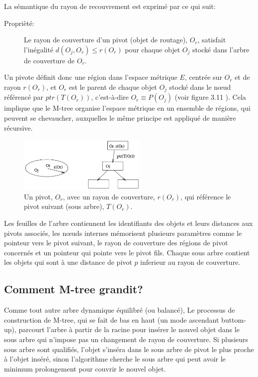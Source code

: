 La sémantique du rayon de recouvrement est exprimé par ce qui suit:
\begin{description}
	\item[Proprièté:] Le rayon de couverture d'un pivot (objet de routage), $ O_r $, satisfait l'inégalité $ d(O_j, O_r) \le r(O_r) $ pour chaque objet $ O_j $ stocké dans l'arbre de couverture de $ O_r $.
\end{description}

Un pivote définit donc une région dans l'espace métrique $ E $, centrée sur $ O_r $ et de rayon $ r(O_r) $, et $ O_r $ est le parent de chaque objet $ O_j $ stocké dans le nœud référencé par $ ptr(T(O_r)) $, c'est-à-dire $ O_r \equiv P(O_j)$ (voir figure 3.11 ).  Cela implique que le M-tree organise l'espace métrique en un ensemble de régions, qui peuvent se chevaucher, auxquelles le même principe est appliqué de manière récursive.

\begin{figure}[H]
	\centering
	\includegraphics[width=0.55\textwidth]{Figures/mtree.png} %
	\caption{ Un pivot, $ O_r $, avec un rayon de couverture, $  r(O_r) $, qui référence le pivot suivant (sous arbre), $ T(O_r) $.}
\end{figure}

Les feuilles de l’arbre contiennent les identifiants des objets et leurs distances aux pivots associés, les nœuds internes mémorisent plusieurs paramètres comme le pointeur vers le pivot suivant, le rayon de couverture des régions de pivot concernés et un pointeur qui pointe vers le pivot fils. Chaque sous arbre contient les objets qui sont à une distance de pivot $ p $ inferieur au rayon de couverture.\\

\subsection{Comment M-tree grandit?}

Comme tout autre arbre dynamique équilibré (ou balancé), Le processus de construction de M-tree, qui se fait de bas en haut (un mode ascendant buttom-up), parcourt l'arbre à partir de la racine pour insérer le nouvel objet dans le sous arbre qui n'impose pas un changement de rayon de couverture. Si plusieurs sous arbre sont qualifiés, l'objet s'inséra dans le sous arbre de pivot le plus proche à l'objet inséré, sinon l'algorithme cherche le sous arbre qui peut avoir le minimum prolongement pour couvrir le nouvel objet.\\

